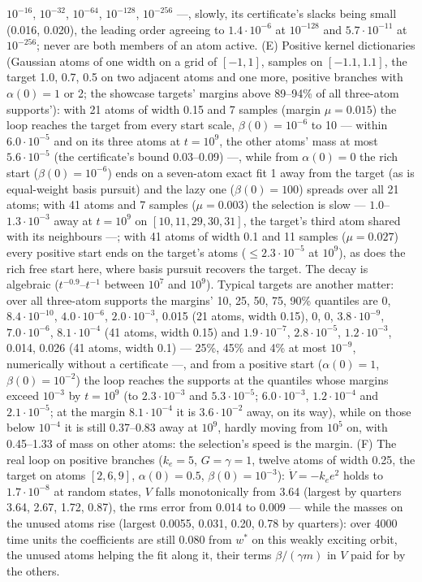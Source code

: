 \begin{sloppypar}
$10^{-16}$, $10^{-32}$, $10^{-64}$, $10^{-128}$, $10^{-256}$ ---, slowly, its certificate's slacks being small (0.016,
0.020), the leading order agreeing to $1.4\cdot10^{-6}$ at $10^{-128}$ and $5.7\cdot10^{-11}$ at $10^{-256}$; never are
both members of an atom active. (E) Positive kernel dictionaries (Gaussian atoms of one width on a grid of $[-1,1]$,
samples on $[-1.1,1.1]$, the target 1.0, 0.7, 0.5 on two adjacent atoms and one more, positive branches with
$\alpha(0) = 1$ or 2; the showcase targets' margins above 89--94\% of all three-atom supports'): with 21 atoms of width
0.15 and 7 samples (margin $\mu = 0.015$) the loop reaches the target from every start scale, $\beta(0) = 10^{-6}$ to
10 --- within $6.0\cdot10^{-5}$ and on its three atoms at $t = 10^9$, the other atoms' mass at most $5.6\cdot10^{-5}$
(the certificate's bound 0.03--0.09) ---, while from $\alpha(0) = 0$ the rich start ($\beta(0) = 10^{-6}$) ends on a
seven-atom exact fit 1 away from the target (as is equal-weight basis pursuit) and the lazy one ($\beta(0) = 100$)
spreads over all 21 atoms; with 41 atoms and 7 samples ($\mu = 0.003$) the selection is slow ---
$1.0$--$1.3\cdot10^{-3}$ away at $t = 10^9$ on $[10, 11, 29, 30, 31]$, the target's third atom shared with its
neighbours ---; with 41 atoms of width 0.1 and 11 samples ($\mu = 0.027$) every positive start ends on the target's
atoms ($\le2.3\cdot10^{-5}$ at $10^9$), as does the rich free start here, where basis pursuit recovers the target. The
decay is algebraic ($t^{-0.9}$--$t^{-1}$ between $10^7$ and $10^9$). Typical targets are another matter: over all
three-atom supports the margins' 10, 25, 50, 75, 90\% quantiles are 0, $8.4\cdot10^{-10}$, $4.0\cdot10^{-6}$,
$2.0\cdot10^{-3}$, 0.015 (21 atoms, width 0.15), 0, 0, $3.8\cdot10^{-9}$, $7.0\cdot10^{-6}$, $8.1\cdot10^{-4}$ (41
atoms, width 0.15) and $1.9\cdot10^{-7}$, $2.8\cdot10^{-5}$, $1.2\cdot10^{-3}$, 0.014, 0.026 (41 atoms, width 0.1) ---
25\%, 45\% and 4\% at most $10^{-9}$, numerically without a certificate ---, and from a positive start
($\alpha(0) = 1$, $\beta(0) = 10^{-2}$) the loop reaches the supports at the quantiles whose margins exceed $10^{-3}$ by
$t = 10^9$ (to $2.3\cdot10^{-3}$ and $5.3\cdot10^{-5}$; $6.0\cdot10^{-3}$, $1.2\cdot10^{-4}$ and $2.1\cdot10^{-5}$; at
the margin $8.1\cdot10^{-4}$ it is $3.6\cdot10^{-2}$ away, on its way), while on those below $10^{-4}$ it is still
0.37--0.83 away at $10^9$, hardly moving from $10^5$ on, with 0.45--1.33 of mass on other atoms: the selection's speed
is the margin. (F) The real loop on positive branches ($k_e = 5$, $G = \gamma = 1$, twelve atoms of width 0.25, the
target on atoms $[2, 6, 9]$, $\alpha(0) = 0.5$, $\beta(0) = 10^{-3}$): $\dot V = -k_ee^2$ holds to $1.7\cdot10^{-8}$
at random states, $V$ falls monotonically from 3.64 (largest by quarters 3.64, 2.67, 1.72, 0.87), the rms error from
0.014 to 0.009 --- while the masses on the unused atoms rise (largest 0.0055, 0.031, 0.20, 0.78 by quarters): over 4000
time units the coefficients are still 0.080 from $w^*$ on this weakly exciting orbit, the unused atoms helping the fit
along it, their terms $\beta/(\gamma m)$ in $V$ paid for by the others.
\end{sloppypar}

